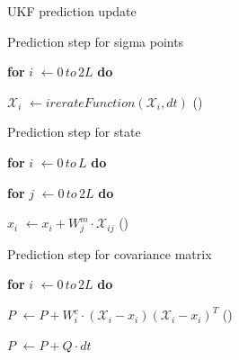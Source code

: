 \documentclass[../Head/report.tex]{subfiles}
\begin{document}
\begin{Pseudo}{UKF prediction update}{}
\begin{Indentation}

	\item Prediction step for sigma points  
	\item \textbf{for} $i$ \(\leftarrow 0\, to\, 2L\) \textbf{do}
        \begin{Indentation}
            \item $\mathcal{X}_i$ \(\leftarrow irerateFunction(\mathcal{X}_i,dt) \) \qquad {}(\theequation)\label{eq:update_predict_sigma_points}
        \end{Indentation}
    
    \item Prediction step for state
	\item \textbf{for} $i$ \(\leftarrow 0\, to\, L\) \textbf{do}
        \begin{Indentation}
        	\item \textbf{for} $j$ \(\leftarrow 0\, to\, 2L\) \textbf{do}
        		\begin{Indentation}
            		\item $x_i$ \(\leftarrow  x_i +  W^{m}_j \cdot \mathcal{X}_{ij} \)  \qquad {}(\theequation)\label{eq:update_predict_state}
         		\end{Indentation}
         \end{Indentation}	
         
    \item Prediction step for covariance matrix
	\item \textbf{for} $i$ \(\leftarrow 0\, to\, 2L\) \textbf{do}
        \begin{Indentation}
            \item $P$ \(\leftarrow P + W^{c}_i \cdot (\mathcal{X}_i - x_i)(\mathcal{X}_i - x_i)^T \) \qquad {}(\theequation)\label{eq:update_predict_covariance}
        \end{Indentation}
    \item $P$ \(\leftarrow P + Q \cdot dt \)
\end{Indentation}
\end{Pseudo}
\end{document}
